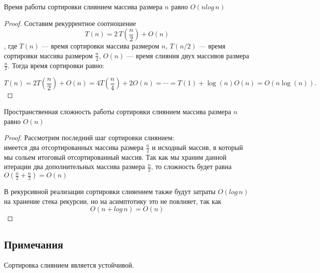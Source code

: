 \begin{theorem}

    Время работы сортировки слиянием массива размера $n$ равно $O(nlog\,{n})$

\end{theorem}

\begin{proof}
    Составим рекуррентное соотношение \[T(n) = 2\,T(\frac{n}{2})+O(n)\], где $T(n)$ — время сортировки массива размером $n$, $T(n/2)$
    — время сортировки массива размером $\frac{n}{2}$, $O(n)$ — время слияния двух массивов размера $\frac{n}{2}$.
    Тогда время сортировки равно:

    \[ T(n) = 2T\left(\frac{n}{2}\right) + O(n) = 4T\left(\frac{n}{4}\right) + 2O(n) = \cdots = T(1) + \log(n)O(n) = O(n \log(n)). \]
\end{proof}

\begin{theorem}

    Пространственная сложность работы сортировки слиянием массива размера $n$ равно $O(n)$

\end{theorem}

\begin{proof}
    Рассмотрим последний шаг сортировки слиянием:\\
    имеется два отсортированных массива размера $\frac{n}{2}$ и исходный массив, в который мы сольем итоговый отсортированный массив.
    Так как мы храним данной итерации два дополнительных массива размера $\frac{n}{2}$, то сложность будет равна $O(\frac{n}{2} + \frac{n}{2})=O(n)$

    В рекурсивной реализации сортировки слияением также будут затраты $O(log\,{n})$ на хранение стека рекурсии, но на асимптотику это не повлияет, так как \[O(n + log\,{n})=O(n)\]
\end{proof}

\subsection{Примечания}
Сортировка слиянием является устойчивой.